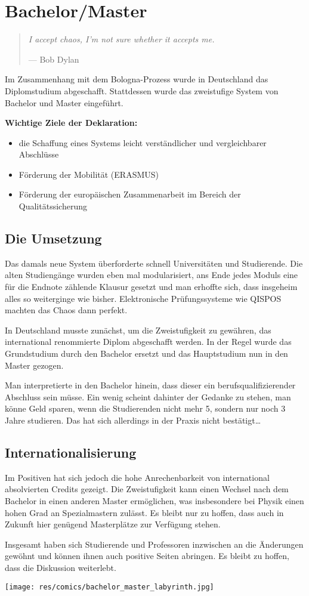 \section{Bachelor/Master}

\begin{multicols}{2}
\begin{quote}
\textit{I accept chaos, I'm not sure whether it accepts me.}

\hfill--- Bob Dylan
\end{quote}
Im Zusammenhang mit dem Bologna-Prozess wurde in Deutschland das Diplomstudium abgeschafft. Stattdessen wurde das zweistufige System von Bachelor und Master eingeführt.

\textbf{Wichtige Ziele der Deklaration:}
\begin{itemize}
\item die Schaffung eines Systems leicht verständlicher und vergleichbarer Abschlüsse
\item Förderung der Mobilität (ERASMUS)
\item Förderung der europäischen Zusammenarbeit im Bereich der Qualitätssicherung
\end{itemize}

\subsection*{Die Umsetzung}
Das damals neue System überforderte schnell Universitäten und Studierende. Die alten Studiengänge wurden eben mal modularisiert, ans Ende jedes Moduls eine für die Endnote zählende Klausur gesetzt und man erhoffte sich, dass insgeheim alles so weiterginge wie bisher. Elektronische Prüfungssysteme wie QISPOS machten das Chaos dann perfekt.

In Deutschland musste zunächst, um die Zweistufigkeit zu gewähren, das international renommierte Diplom abgeschafft werden. In der Regel wurde das Grundstudium durch den Bachelor ersetzt und das Hauptstudium nun in den Master gezogen.

Man interpretierte in den Bachelor hinein, dass dieser ein berufsqualifizierender Abschluss sein müsse. Ein wenig scheint dahinter der Gedanke zu stehen, man könne Geld sparen, wenn die Studierenden nicht mehr 5, sondern nur noch 3 Jahre studieren. Das hat sich allerdings in der Praxis nicht bestätigt\dots

\subsection*{Internationalisierung}
Im Positiven hat sich jedoch die hohe Anrechenbarkeit von international absolvierten Credits gezeigt.
Die Zweistufigkeit kann einen Wechsel nach dem Bachelor in einen anderen Master ermöglichen, was insbesondere bei Physik einen hohen Grad an Spezialmastern zulässt. Es bleibt nur zu hoffen, dass auch in Zukunft hier genügend Masterplätze zur Verfügung stehen.

Insgesamt haben sich Studierende und Professoren inzwischen an die Änderungen gewöhnt und können ihnen auch positive Seiten abringen.
Es bleibt zu hoffen, dass die Diskussion weiterlebt.

\end{multicols}
\vspace{-2em}
\begin{center}
\texttt{[image: res/comics/bachelor\_master\_labyrinth.jpg]}
\end{center}

